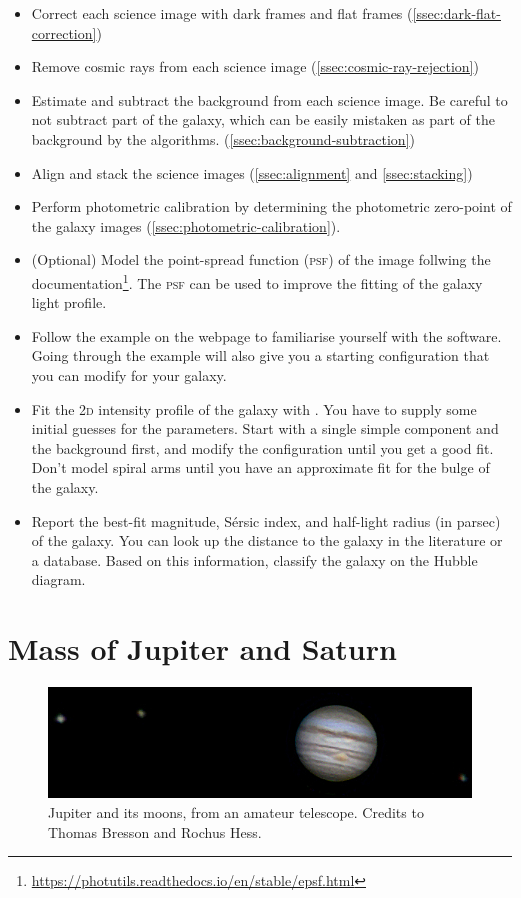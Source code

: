 \documentclass[a4paper, 11pt, fleqn]{memoir}
\begin{document}
\begin{itemize}
    \item Correct each science image with dark frames and flat frames (\cref{ssec:dark-flat-correction})
    \item Remove cosmic rays from each science image (\cref{ssec:cosmic-ray-rejection})
    \item Estimate and subtract the background from each science image. Be careful to not subtract part of the galaxy, which can be easily mistaken as part of the background by the algorithms. (\cref{ssec:background-subtraction})
    \item Align and stack the science images (\cref{ssec:alignment} and \cref{ssec:stacking})
    \item Perform photometric calibration by determining the photometric zero-point of the galaxy images (\cref{ssec:photometric-calibration}).
    \item (Optional) Model the point-spread function (\textsc{psf}) of the image follwing the  documentation\footnote{\url{https://photutils.readthedocs.io/en/stable/epsf.html}}. The \textsc{psf} can be used to improve the fitting of the galaxy light profile.
    \item Follow the example on the  webpage to familiarise yourself with the software. Going through the example will also give you a starting configuration that you can modify for your galaxy.
    \item Fit the \textsc{2d} intensity profile of the galaxy with . You have to supply some initial guesses for the parameters. Start with a single simple component and the background first, and modify the configuration until you get a good fit. Don't model spiral arms until you have an approximate fit for the bulge of the galaxy.
    \item Report the best-fit magnitude, Sérsic index, and half-light radius (in parsec) of the galaxy. You can look up the distance to the galaxy in the literature or a database. Based on this information, classify the galaxy on the Hubble diagram.
\end{itemize}


\section{Mass of Jupiter and Saturn}

\begin{figure}
    \centering
    \includegraphics[width=12cm]{jupiter}
    \caption{Jupiter and its moons, from an amateur telescope.
        Credits to Thomas Bresson and Rochus Hess.
    }
    \label{fig:jupiter}
\end{figure}
\end{document}
